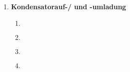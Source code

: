 \documentclass[11pt,letterpaper]{article}
\begin{document}
\begin{enumerate}
\begin{enumerate}
        \end{enumerate}

    
    \item \textbf{Kondensatorauf-/ und -umladung}
        \begin{enumerate}
            \item
            \begin{align*}
            \end{align*}

            \item
            \begin{align*}
            \end{align*}
            
            \item
            \begin{align*}
            \end{align*}

            \item
            \begin{align*}
            \end{align*}

        \end{enumerate}
\end{enumerate}
\end{document}
